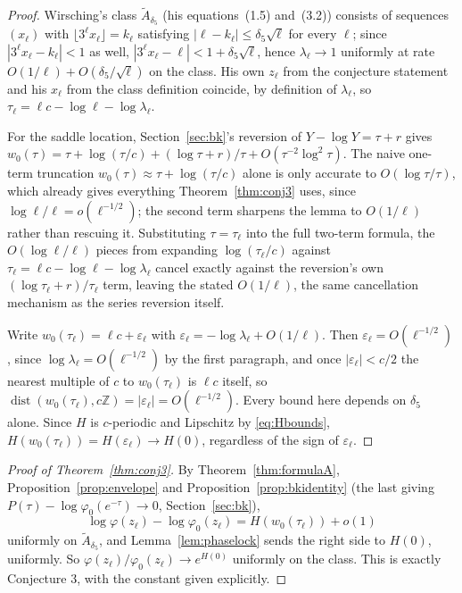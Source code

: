 \documentclass[11pt]{article}
\theoremstyle{definition}
\theoremstyle{remark}
\newcommand{\Z}{\mathbb{Z}}
\begin{document}
\begin{proof}
Wirsching's class $\widetilde{A}_{\delta_5}$ (his equations~(1.5) and~(3.2)) consists of sequences
$(x_\ell)$ with $\lfloor 3^\ell x_\ell\rfloor = k_\ell$ satisfying $|\ell-k_\ell|\le\delta_5\sqrt \ell$ for every $\ell$; since
$|3^\ell x_\ell-k_\ell|<1$ as well, $|3^\ell x_\ell-\ell|<1+\delta_5\sqrt \ell$, hence $\lambda_\ell \to 1$
uniformly at rate $O(1/\ell)+O(\delta_5/\sqrt \ell)$ on the class. His
own $z_\ell$ from the conjecture statement and his $x_\ell$ from the
class definition coincide, by definition of $\lambda_\ell$, so
$\tau_\ell = \ell c - \log\ell - \log\lambda_\ell$.

For the saddle location, Section~\ref{sec:bk}'s reversion of
$Y-\log Y=\tau+r$ gives $w_0(\tau) = \tau+\log(\tau/c)+(\log\tau+r)/\tau+O(\tau^{-2}\log^2\tau)$.
The naive one-term truncation $w_0(\tau)\approx\tau+\log(\tau/c)$ alone is only accurate to
$O(\log\tau/\tau)$, which already gives everything Theorem~\ref{thm:conj3} uses, since
$\log\ell/\ell=o(\ell^{-1/2})$; the second term sharpens the lemma to $O(1/\ell)$ rather than
rescuing it. Substituting $\tau=\tau_\ell$ into the full two-term
formula, the $O(\log \ell/\ell)$ pieces from expanding $\log(\tau_\ell/c)$ against $\tau_\ell = \ell c-\log \ell-\log\lambda_\ell$
cancel exactly against the reversion's own $(\log\tau_\ell+r)/\tau_\ell$ term, leaving the stated $O(1/\ell)$,
the same cancellation mechanism as the series reversion itself.

Write $w_0(\tau_\ell)=\ell c+\varepsilon_\ell$ with
$\varepsilon_\ell=-\log\lambda_\ell+O(1/\ell)$. Then
$\varepsilon_\ell=O(\ell^{-1/2})$, since $\log\lambda_\ell=O(\ell^{-1/2})$
by the first paragraph, and once $|\varepsilon_\ell|<c/2$ the nearest
multiple of $c$ to $w_0(\tau_\ell)$ is $\ell c$ itself, so
$\operatorname{dist}(w_0(\tau_\ell),c\Z)=|\varepsilon_\ell|=O(\ell^{-1/2})$.
Every bound here depends on $\delta_5$ alone. Since $H$ is
$c$-periodic and Lipschitz by \eqref{eq:Hbounds},
$H(w_0(\tau_\ell))=H(\varepsilon_\ell)\to H(0)$, regardless of the
sign of $\varepsilon_\ell$.
\end{proof}

\begin{proof}[Proof of Theorem~\ref{thm:conj3}]
By Theorem~\ref{thm:formulaA}, Proposition~\ref{prop:envelope} and
Proposition~\ref{prop:bkidentity} (the last giving
$P(\tau)-\log\varphi_0(e^{-\tau})\to0$, Section~\ref{sec:bk}),
\[
\log\varphi(z_\ell) - \log\varphi_0(z_\ell) = H(w_0(\tau_\ell)) + o(1)
\]
uniformly on $\widetilde A_{\delta_5}$, and
Lemma~\ref{lem:phaselock} sends the right side to $H(0)$, uniformly.
So $\varphi(z_\ell)/\varphi_0(z_\ell) \to e^{H(0)}$ uniformly on the
class. This is exactly Conjecture 3, with the constant given
explicitly.
\end{proof}
\end{document}
